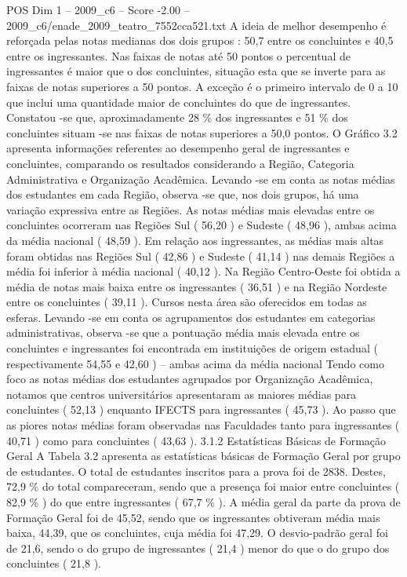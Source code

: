 \begin{textsample}{POS Dim 1 – 2009\_c6 – Score -2.00 – 2009\_c6/enade\_2009\_teatro\_7552cca521.txt}
A ideia de melhor desempenho é reforçada pelas notas medianas dos dois grupos : 50,7 entre os concluintes e 40,5 entre os ingressantes.
Nas faixas de notas até 50 pontos o percentual de ingressantes é maior que o dos concluintes, situação esta que se inverte para as faixas de notas superiores a 50 pontos.
A exceção é o primeiro intervalo de 0 a 10 que inclui uma quantidade maior de concluintes do que de ingressantes.
Constatou -se que, aproximadamente 28 \% dos ingressantes e 51 \% dos concluintes situam -se nas faixas de notas superiores a 50,0 pontos.
O Gráfico 3.2 apresenta informações referentes ao desempenho geral de ingressantes e concluintes, comparando os resultados considerando a Região, Categoria Administrativa e Organização Acadêmica.
Levando -se em conta as notas médias dos estudantes em cada Região, observa -se que, nos dois grupos, há uma variação expressiva entre as Regiões.
As notas médias mais elevadas entre os concluintes ocorreram nas Regiões Sul ( 56,20 ) e Sudeste ( 48,96 ), ambas acima da média nacional ( 48,59 ).
Em relação aos ingressantes, as médias mais altas foram obtidas nas Regiões Sul ( 42,86 ) e Sudeste ( 41,14 ) nas demais Regiões a média foi inferior à média nacional ( 40,12 ).
Na Região Centro-Oeste foi obtida a média de notas mais baixa entre os ingressantes ( 36,51 ) e na Região Nordeste entre os concluintes ( 39,11 ).
Cursos nesta área são oferecidos em todas as esferas.
Levando -se em conta os agrupamentos dos estudantes em categorias administrativas, observa -se que a pontuação média mais elevada entre os concluintes e ingressantes foi encontrada em instituições de origem estadual ( respectivamente 54,55 e 42,60 ) – ambas acima da média nacional Tendo como foco as notas médias dos estudantes agrupados por Organização Acadêmica, notamos que centros universitários apresentaram as maiores médias para concluintes ( 52,13 ) enquanto IFECTS para ingressantes ( 45,73 ).
Ao passo que as piores notas médias foram observadas nas Faculdades tanto para ingressantes ( 40,71 ) como para concluintes ( 43,63 ). 3.1.2 Estatísticas Básicas de Formação Geral A Tabela 3.2 apresenta as estatísticas básicas de Formação Geral por grupo de estudantes.
O total de estudantes inscritos para a prova foi de 2838.
Destes, 72,9 \% do total compareceram, sendo que a presença foi maior entre concluintes ( 82,9 \% ) do que entre ingressantes ( 67,7 \% ).
A média geral da parte da prova de Formação Geral foi de 45,52, sendo que os ingressantes obtiveram média mais baixa, 44,39, que os concluintes, cuja média foi 47,29.
O desvio-padrão geral foi de 21,6, sendo o do grupo de ingressantes ( 21,4 ) menor do que o do grupo dos concluintes ( 21,8 ).

\end{textsample}

